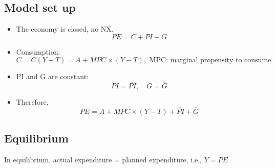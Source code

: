 \documentclass[10pt]{article}
\begin{document}
\subsection{Model set up}
\begin{itemize}
\item The economy is closed, no NX. 
		\begin{equation*}
		PE = C + PI + G
		\end{equation*}

\item Consumption:
		\begin{equation*}
		C = C(Y - T) = A + MPC  \times (Y - T), \text{ MPC: marginal propensity to consume }
		\end{equation*}

\item PI and G are constant:
		\begin{equation*}
		PI =  \overline{PI}, \quad G =  \overline{G}
		\end{equation*}


\item Therefore, 
		\begin{equation*}
		PE = A + MPC  \times (Y - T) +  \overline{PI} +  \overline{G}
		\end{equation*}
\end{itemize}




\subsection{Equilibrium}
In equilibrium, actual expenditure = planned expenditure, i.e., $ Y = PE $

\begin{figure}[H]
\end{figure}
\end{document}
